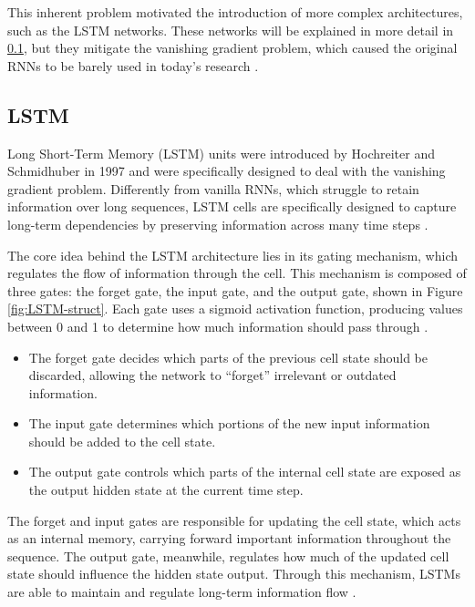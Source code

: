 This inherent problem motivated the introduction of more complex architectures, such as the LSTM networks. These networks will be explained in more detail in \ref{sec-LSTM}, but they mitigate the vanishing gradient problem, which caused the original RNNs to be barely used in today's research \cite{fang-wei,GAO2019279}.

\subsection{LSTM} \label{sec-LSTM}

Long Short-Term Memory (LSTM) units were introduced by Hochreiter and Schmidhuber in 1997 \cite{Hochreiter} and were specifically designed to deal with the vanishing gradient problem. Differently from vanilla RNNs, which struggle to retain information over long sequences, LSTM cells are specifically designed to capture long-term dependencies by preserving information across many time steps \cite{ALSELWI2024102068,schmidt2019recurrentneuralnetworksrnns}.

The core idea behind the LSTM architecture lies in its gating mechanism, which regulates the flow of information through the cell. This mechanism is composed of three gates: the forget gate, the input gate, and the output gate, shown in Figure \ref{fig:LSTM-struct}. Each gate uses a sigmoid activation function, producing values between 0 and 1 to determine how much information should pass through \cite{schmidt2019recurrentneuralnetworksrnns}.

\begin{itemize}
    \item The forget gate decides which parts of the previous cell state should be discarded, allowing the network to “forget” irrelevant or outdated information. 
    \item The input gate determines which portions of the new input information should be added to the cell state.
    \item The output gate controls which parts of the internal cell state are exposed as the output hidden state at the current time step.
\end{itemize}

The forget and input gates are responsible for updating the cell state, which acts as an internal memory, carrying forward important information throughout the sequence. The output gate, meanwhile, regulates how much of the updated cell state should influence the hidden state output. Through this mechanism, LSTMs are able to maintain and regulate long-term information flow \cite{ALSELWI2024102068}.

